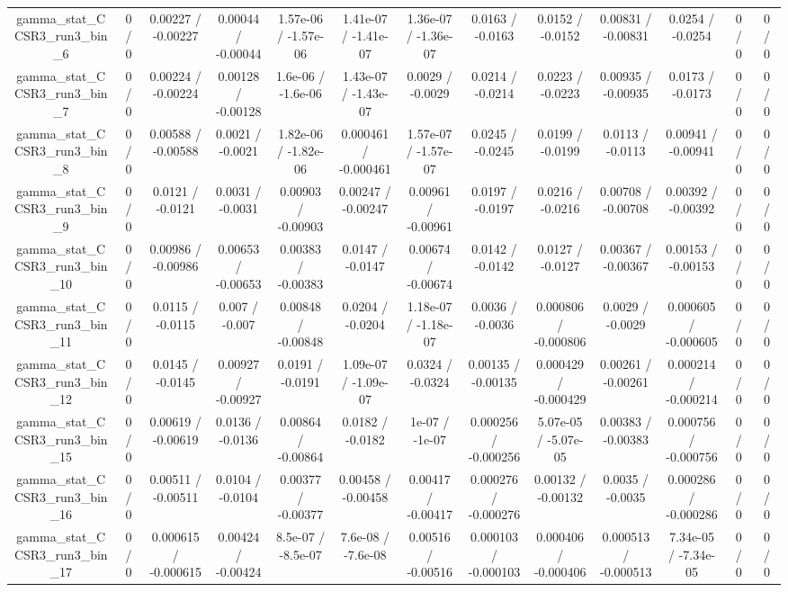\documentclass[10pt]{article}
\begin{document}
\begin{table}[htbp]
\begin{center}
\begin{tabular}{|c|c|c|c|c|c|c|c|c|c|c|c|c|}
  gamma_stat_CCSR3_run3_bin_6 & 0 / 0 & 0.00227 / -0.00227 & 0.00044 / -0.00044 & 1.57e-06 / -1.57e-06 & 1.41e-07 / -1.41e-07 & 1.36e-07 / -1.36e-07 & 0.0163 / -0.0163 & 0.0152 / -0.0152 & 0.00831 / -0.00831 & 0.0254 / -0.0254 & 0 / 0 & 0 / 0 \\ 
  gamma_stat_CCSR3_run3_bin_7 & 0 / 0 & 0.00224 / -0.00224 & 0.00128 / -0.00128 & 1.6e-06 / -1.6e-06 & 1.43e-07 / -1.43e-07 & 0.0029 / -0.0029 & 0.0214 / -0.0214 & 0.0223 / -0.0223 & 0.00935 / -0.00935 & 0.0173 / -0.0173 & 0 / 0 & 0 / 0 \\ 
  gamma_stat_CCSR3_run3_bin_8 & 0 / 0 & 0.00588 / -0.00588 & 0.0021 / -0.0021 & 1.82e-06 / -1.82e-06 & 0.000461 / -0.000461 & 1.57e-07 / -1.57e-07 & 0.0245 / -0.0245 & 0.0199 / -0.0199 & 0.0113 / -0.0113 & 0.00941 / -0.00941 & 0 / 0 & 0 / 0 \\ 
  gamma_stat_CCSR3_run3_bin_9 & 0 / 0 & 0.0121 / -0.0121 & 0.0031 / -0.0031 & 0.00903 / -0.00903 & 0.00247 / -0.00247 & 0.00961 / -0.00961 & 0.0197 / -0.0197 & 0.0216 / -0.0216 & 0.00708 / -0.00708 & 0.00392 / -0.00392 & 0 / 0 & 0 / 0 \\ 
  gamma_stat_CCSR3_run3_bin_10 & 0 / 0 & 0.00986 / -0.00986 & 0.00653 / -0.00653 & 0.00383 / -0.00383 & 0.0147 / -0.0147 & 0.00674 / -0.00674 & 0.0142 / -0.0142 & 0.0127 / -0.0127 & 0.00367 / -0.00367 & 0.00153 / -0.00153 & 0 / 0 & 0 / 0 \\ 
  gamma_stat_CCSR3_run3_bin_11 & 0 / 0 & 0.0115 / -0.0115 & 0.007 / -0.007 & 0.00848 / -0.00848 & 0.0204 / -0.0204 & 1.18e-07 / -1.18e-07 & 0.0036 / -0.0036 & 0.000806 / -0.000806 & 0.0029 / -0.0029 & 0.000605 / -0.000605 & 0 / 0 & 0 / 0 \\ 
  gamma_stat_CCSR3_run3_bin_12 & 0 / 0 & 0.0145 / -0.0145 & 0.00927 / -0.00927 & 0.0191 / -0.0191 & 1.09e-07 / -1.09e-07 & 0.0324 / -0.0324 & 0.00135 / -0.00135 & 0.000429 / -0.000429 & 0.00261 / -0.00261 & 0.000214 / -0.000214 & 0 / 0 & 0 / 0 \\ 
  gamma_stat_CCSR3_run3_bin_15 & 0 / 0 & 0.00619 / -0.00619 & 0.0136 / -0.0136 & 0.00864 / -0.00864 & 0.0182 / -0.0182 & 1e-07 / -1e-07 & 0.000256 / -0.000256 & 5.07e-05 / -5.07e-05 & 0.00383 / -0.00383 & 0.000756 / -0.000756 & 0 / 0 & 0 / 0 \\ 
  gamma_stat_CCSR3_run3_bin_16 & 0 / 0 & 0.00511 / -0.00511 & 0.0104 / -0.0104 & 0.00377 / -0.00377 & 0.00458 / -0.00458 & 0.00417 / -0.00417 & 0.000276 / -0.000276 & 0.00132 / -0.00132 & 0.0035 / -0.0035 & 0.000286 / -0.000286 & 0 / 0 & 0 / 0 \\ 
  gamma_stat_CCSR3_run3_bin_17 & 0 / 0 & 0.000615 / -0.000615 & 0.00424 / -0.00424 & 8.5e-07 / -8.5e-07 & 7.6e-08 / -7.6e-08 & 0.00516 / -0.00516 & 0.000103 / -0.000103 & 0.000406 / -0.000406 & 0.000513 / -0.000513 & 7.34e-05 / -7.34e-05 & 0 / 0 & 0 / 0 \\ 

\end{tabular}
\end{center}
\end{table}
\end{document}
